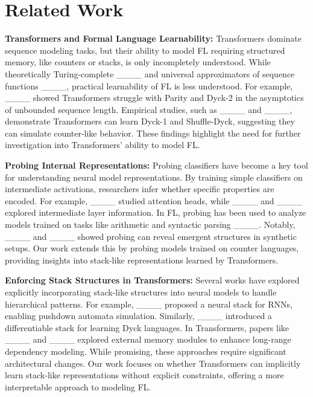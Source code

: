 \section{Related Work}
\textbf{Transformers and Formal Language Learnability:}
Transformers dominate sequence modeling tasks, but their ability to model FL requiring structured memory, like counters or stacks, is only incompletely understood. While theoretically Turing-complete ____ and universal approximators of sequence functions ____, practical learnability of FL is less understood. For example, ____ showed Transformers struggle with Parity and Dyck-2 in the asymptotics of unbounded sequence length. Empirical studies, such as ____ and ____, demonstrate Transformers can learn Dyck-1 and Shuffle-Dyck, suggesting they can simulate counter-like behavior. These findings highlight the need for further investigation into Transformers' ability to model FL.

\textbf{Probing Internal Representations:}
Probing classifiers have become a key tool for understanding neural model representations. By training simple classifiers on intermediate activations, researchers infer whether specific properties are encoded. For example, ____ studied attention heads, while ____ and ____ explored intermediate layer information. In FL, probing has been used to analyze models trained on tasks like arithmetic and syntactic parsing ____. Notably, ____ and ____ showed probing can reveal emergent structures in synthetic setups. Our work extends this by probing models trained on counter languages, providing insights into stack-like representations learned by Transformers.

\textbf{Enforcing Stack Structures in Transformers:}
Several works have explored explicitly incorporating stack-like structures into neural models to handle hierarchical patterns. For example, ____ proposed a neural stack for RNNs, enabling pushdown automata simulation. Similarly, ____ introduced a differentiable stack for learning Dyck languages. In Transformers, papers like ____ and ____ explored external memory modules to enhance long-range dependency modeling. While promising, these approaches require significant architectural changes. Our work focuses on whether Transformers can implicitly learn stack-like representations without explicit constraints, offering a more interpretable approach to modeling FL.


